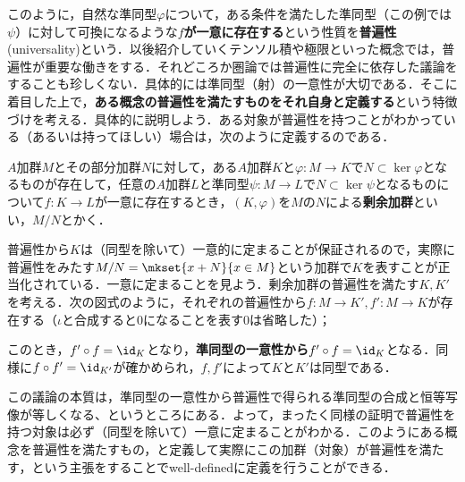 このように，自然な準同型$\varphi$について，ある条件を満たした準同型（この例では$\psi$）に対して可換になるような\textbf{$f$が一意に存在する}という性質を\textbf{普遍性}(universality)という．以後紹介していくテンソル積や極限といった概念では，普遍性が重要な働きをする．それどころか圏論では普遍性に完全に依存した議論をすることも珍しくない．具体的には準同型（射）の一意性が大切である．そこに着目した上で，\textbf{ある概念の普遍性を満たすものをそれ自身と定義する}という特徴づけを考える．具体的に説明しよう．ある対象が普遍性を持つことがわかっている（あるいは持ってほしい）場合は，次のように定義するのである．

\begin{defi}[普遍性による剰余加群の定義]
	$A$加群$M$とその部分加群$N$に対して，ある$A$加群$K$と$\varphi:M\to K$で$N\subset\ker\varphi$となるものが存在して，任意の$A$加群$L$と準同型$\psi:M\to L$で$N\subset\ker\psi$となるものについて$f:K\to L$が一意に存在するとき，$(K,\varphi)$を$M$の$N$による\textbf{剰余加群}といい，$M/N$とかく．
\end{defi}

普遍性から$K$は（同型を除いて）一意的に定まることが保証されるので，実際に普遍性をみたす$M/N=\mkset{x+N}{x\in M}$という加群で$K$を表すことが正当化されている．一意に定まることを見よう．剰余加群の普遍性を満たす$K,K'$を考える．次の図式のように，それぞれの普遍性から$f:M\to K',f':M\to K$が存在する（$\iota$と合成すると$0$になることを表す$0$は省略した）；
\begin{figure}[H]
	\centering
	\caption{}
\end{figure}

このとき，$f'\circ f=\id_K$となり，\textbf{準同型の一意性から}$f'\circ f=\id_K$となる．同様に$f\circ f'=\id_{K'}$が確かめられ，$f,f'$によって$K$と$K'$は同型である．

この議論の本質は，準同型の一意性から普遍性で得られる準同型の合成と恒等写像が等しくなる、というところにある．よって，まったく同様の証明で普遍性を持つ対象は必ず（同型を除いて）一意に定まることがわかる．このようにある概念を普遍性を満たすもの，と定義して実際にこの加群（対象）が普遍性を満たす，という主張をすることでwell-definedに定義を行うことができる．

